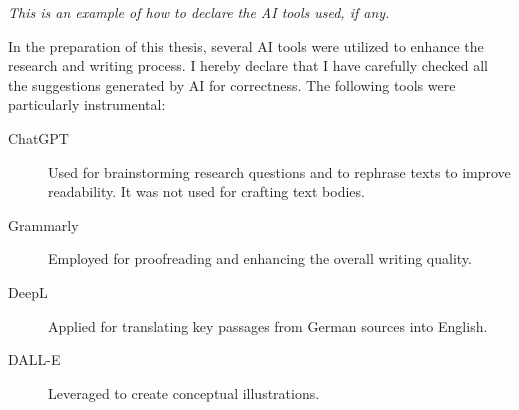 \emph{This is an example of how to declare the AI tools used, if any.}

In the preparation of this thesis, several AI tools were utilized to enhance the research and writing process.
I hereby declare that I have carefully checked all the suggestions generated by AI for correctness.
The following tools were particularly instrumental:

\begin{description}
    \item[ChatGPT] Used for brainstorming research questions and to rephrase texts to improve readability. It was not used for crafting text bodies.
    \item[Grammarly] Employed for proofreading and enhancing the overall writing quality.
    \item[DeepL] Applied for translating key passages from German sources into English.
    \item[DALL-E] Leveraged to create conceptual illustrations.
\end{description}

